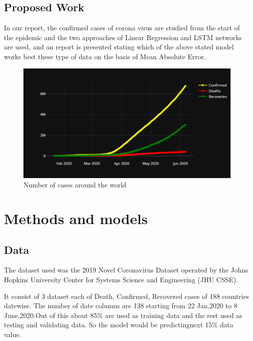 \subsection{Proposed Work}

In our report, the confirmed cases of corona virus are studied from the start
of the epidemic and the two approaches of Linear Regression and LSTM networks
are used, and an report is presented stating which of the above stated model
works best these type of data on the basis of Mean Absolute Error.

\begin{figure}[h!]
	\centering
	\includegraphics[scale=0.4]{images/world_wide.png}
	\caption{Number of cases around the world}
	\label{fig:world}
\end{figure}

%
%


\section{Methods and models}

\subsection{Data}
The dataset used was the 2019 Novel Coronavirus Dataset operated by the
Johns Hopkins University Center for Systems Science and Engineering
(JHU CSSE).

It consist of 3 dataset each of Death, Confirmed, Recovered cases of 188
countries datewise. The number of date columns are 138 starting from 22
Jan,2020 to 8 June,2020.Out of this about 85\% are used as training data
and the rest used as testing and validating data. So the model would be
predictingnext 15\% data value.


